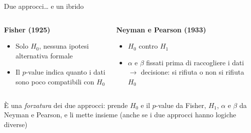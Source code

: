 \documentclass[
  ignorenonframetext,
  compress, aspectratio=149]{beamer}
\providecommand{\tightlist}{%
  \setlength{\itemsep}{0pt}\setlength{\parskip}{0pt}}
\begin{document}
\begin{frame}{Due approcci\ldots{} e un ibrido}
\label{due-approcci-e-un-ibrido}
\small

\begin{columns}[T]
\begin{column}{0.5\linewidth}
\textbf{Fisher (1925)}

\begin{itemize}
\tightlist
\item
  Solo \(H_0\), nessuna ipotesi alternativa formale
\item
  Il \(p\)-value indica quanto i dati sono poco compatibili con \(H_0\)
\end{itemize}
\end{column}

\begin{column}{0.5\linewidth}
\textbf{Neyman e Pearson (1933)}

\begin{itemize}
\tightlist
\item
  \(H_0\) contro \(H_1\)
\item
  \(\alpha\) e \(\beta\) fissati prima di raccogliere i dati
  \(\rightarrow\) decisione: si rifiuta o non si rifiuta \(H_0\)
\end{itemize}
\end{column}
\end{columns}

\vspace{3mm}

\begin{tcolorbox}[enhanced jigsaw, opacityback=0, arc=.35mm, opacitybacktitle=0.6, rightrule=.15mm, breakable, titlerule=0mm, leftrule=.75mm, title={NHST}, toprule=.15mm, toptitle=1mm, coltitle=black, bottomrule=.15mm, bottomtitle=1mm, left=2mm, colframe=quarto-callout-important-color-frame, colback=white, colbacktitle=quarto-callout-important-color!10!white]

È una \emph{forzatura} dei due approcci: prende \(H_0\) e il \(p\)-value
da Fisher, \(H_1\), \(\alpha\) e \(\beta\) da Neyman e Pearson, e li
mette insieme (anche se i due approcci hanno logiche diverse)

\end{tcolorbox}
\end{frame}
\end{document}
